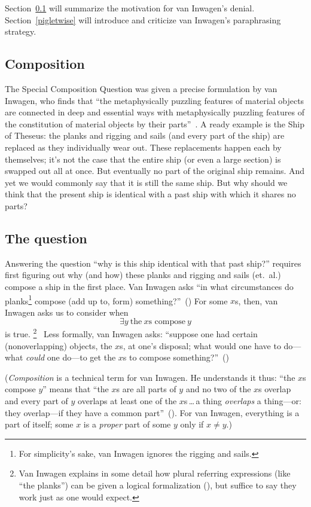 \documentclass[11pt]{article}
\begin{document}
\begin{spacing}{1.5}
Section~\ref{comp} will summarize the motivation for van Inwagen's denial. Section~\ref{pigletwise} will introduce and criticize van Inwagen's paraphrasing strategy.

\subsection{Composition}
\label{comp}
The Special Composition Question was given a precise formulation by van Inwagen, who finds that ``the metaphysically puzzling features of material objects are connected in deep and essential ways with metaphysically puzzling features of the constitution of material objects by their parts''~\citep[18]{inwagen1995}. A ready example is the Ship of Theseus: the planks and rigging and sails (and every part of the ship) are replaced as they individually wear out. These replacements happen each by themselves; it's not the case that the entire ship (or even a large section) is swapped out all at once. But eventually no part of the original ship remains. And yet we would commonly say that it is still the same ship. But why should we think that the present ship is identical with a past ship with which it shares no parts?

\subsection{The question}
\label{scq}
Answering the question ``why is this ship identical with that past ship?'' requires first figuring out why (and how) these planks and rigging and sails (et.\ al.) compose a ship in the first place. Van Inwagen asks ``in what circumstances do planks\footnote{For simplicity's sake, van Inwagen ignores the rigging and sails.} compose (add up to, form) something?''~(\citeyear[21]{inwagen1995}) For some $x$s, then, van Inwagen asks us to consider when
\begin{equation}
\exists y\ \text{the}\ x\text{s compose}\ y
\end{equation}
is true.%
\footnote{Van Inwagen explains in some detail how plural referring expressions (like ``the planks'') can be given a logical formalization (\citeyear[23--28]{inwagen1995}), but suffice to say they work just as one would expect.}%
%
\ Less formally, van Inwagen asks: ``suppose one had certain (nonoverlapping) objects, the $x$s, at one's disposal; what would one have to do---what {\em could} one do---to get the $x$s to compose something?''~(\citeyear[31]{inwagen1995})

({\em Composition} is a technical term for van Inwagen. He understands it thus: ``the $x$s compose $y$'' means that ``the $x$s are all parts of $y$ and no two of the $x$s overlap and every part of $y$ overlaps at least one of the $x$s\,\ldots\,a thing {\em overlaps} a thing---or: they overlap---if they have a common part''~(\citeyear[29]{inwagen1995}). For van Inwagen, everything is a part of itself; some $x$ is a {\em proper} part of some $y$ only if $x \neq y$.)


\end{spacing}
\end{document}
